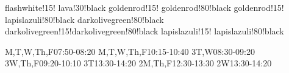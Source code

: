 \documentclass[landscape]{article}
\begin{document}
\pagestyle{fancy}
\chead{}
\CellHeight{0.75in}
\CellWidth{1.8in}
\TextSize{\centering\Large\bfseries}
\FiveDay
\TwelveHour
{}  {flashwhite!15!}    {lava!30!black}
 {goldenrod!15!}     {goldenrod!80!black}
 {goldenrod!15!}     {lapislazuli!80!black}
     {darkolivegreen!80!black}
 {darkolivegreen!15!}{darkolivegreen!80!black}
  {lapislazuli!15!}   {lapislazuli!80!black}



\begin{schedule}
         { }{M,T,W,Th,F}{07:50-08:20}
         { }{M,T,W,Th,F}{10:15-10:40}
        {3}{T,W}{08:30-09:20}
        {3}{W,Th,F}{09:20-10:10}
        {3}{T}{13:30-14:20}
         {2}{M,Th,F}{12:30-13:30}
         {2}{W}{13:30-14:20}
\end{schedule}
\end{document}
